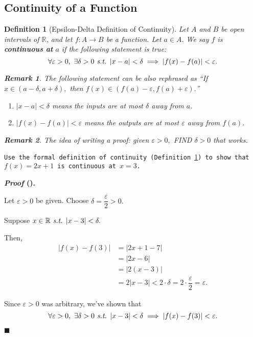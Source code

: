 \documentclass[12pt,a4paper]{article}
\newtheorem{df}{Definition}[subsection]
\newcounter{nprf}[subsection]
\newtheorem*{rmk}{\indent Remark}
\newenvironment*{prf}{\par\indent\textbf{\textit{Proof} (\stepcounter{nprf}\thenprf). }\par }{\par\hfill $\blacksquare$\par}
\def\R{{\mathbb{R}}}
\def\st{\emph{ s.t. }}
\begin{document}
\subsection{Continuity of a Function}
\begin{df}[Epsilon-Delta Definition of Continuity]\label{df3.1.4}
	Let $A$ and $B$ be open intervals of $\R$, and let $f:A\to B$ be a function. Let $a\in A.$ We say $f$ is \textbf{continuous at} $a$ if the following statement is true: \[\forall\varepsilon>0,\ \exists\delta>0\st|x-a|<\delta\implies|f(x)-f(a)|<\varepsilon.\]
	\begin{rmk} The following statement can be also rephrased as ``If $x\in(a-\delta,a+\delta),$ then $f(x)\in(f(a)-\varepsilon,f(a)+\varepsilon).$''\end{rmk}
	\begin{enumerate}
		\item $|x-a|<\delta$ means the inputs are at most $\delta$ away from $a$.
		\item $|f(x)-f(a)|<\varepsilon$ means the outputs are at most $\varepsilon$ away from $f(a)$.	
	\end{enumerate}
	\begin{rmk}
		The idea of writing a proof: given $\varepsilon>0,$ FIND $\delta>0$ that works.	
	\end{rmk}
\end{df}
\begin{framed}
\noindent\texttt{Use the formal definition of continuity (Definition \ref{df3.1.4}) to show that $f(x)=2x+1$ is continuous at $x=3$. }
\begin{prf}
	Let $\varepsilon>0$ be given. Choose $\delta=\dfrac{\varepsilon}{2}>0.$\par Suppose $x\in\R\st |x-3|<\delta.$\par Then, \[\begin{aligned}|f(x)-f(3)|&=|2x+1-7|\\&=|2x-6|\\&=|2(x-3)|\\&=2|x-3|<2\cdot\delta=2\cdot\dfrac{\varepsilon}{2}=\varepsilon.\end{aligned}\]\par Since $\varepsilon>0$ was arbitrary, we've shown that \[\forall\varepsilon>0,\ \exists\delta>0\st|x-3|<\delta\implies|f(x)-f(3)|<\varepsilon.\]
\end{prf}
\end{framed}
\end{document}
